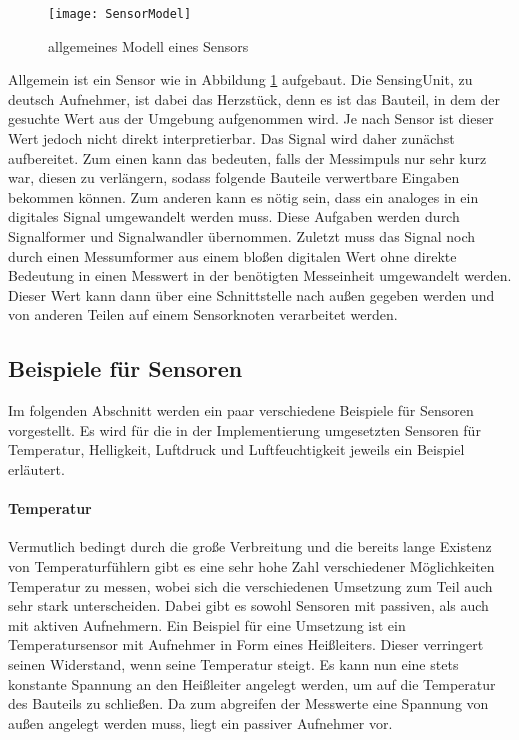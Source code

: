 \begin{figure}[htbp]
\centering
\caption{allgemeines Modell eines Sensors}
\label{fig:SensorModel}
\texttt{[image: SensorModel]}
\end{figure}

Allgemein ist ein Sensor wie in Abbildung \ref{fig:SensorModel} aufgebaut. Die SensingUnit, zu deutsch Aufnehmer, ist dabei das Herzstück, denn es ist das Bauteil, in dem der gesuchte Wert aus der Umgebung aufgenommen wird. Je nach Sensor ist dieser Wert jedoch nicht direkt interpretierbar. Das Signal wird daher zunächst aufbereitet. Zum einen kann das bedeuten, falls der Messimpuls nur sehr kurz war, diesen zu verlängern, sodass folgende Bauteile verwertbare Eingaben bekommen können. Zum anderen kann es nötig sein, dass ein analoges in ein digitales Signal umgewandelt werden muss. Diese Aufgaben werden durch Signalformer und Signalwandler übernommen.\newline
Zuletzt muss das Signal noch durch einen Messumformer aus einem bloßen digitalen Wert ohne direkte Bedeutung in einen Messwert in der benötigten Messeinheit umgewandelt werden. Dieser Wert kann dann über eine Schnittstelle nach außen gegeben werden und von anderen Teilen auf einem Sensorknoten verarbeitet werden.

\subsection{Beispiele für Sensoren}

Im folgenden Abschnitt werden ein paar verschiedene Beispiele für Sensoren vorgestellt. Es wird für die in der Implementierung umgesetzten Sensoren für Temperatur, Helligkeit, Luftdruck und Luftfeuchtigkeit jeweils ein Beispiel erläutert.

\paragraph{Temperatur}

Vermutlich bedingt durch die große Verbreitung und die bereits lange Existenz von Temperaturfühlern gibt es eine sehr hohe Zahl verschiedener Möglichkeiten Temperatur zu messen, wobei sich die verschiedenen Umsetzung zum Teil auch sehr stark unterscheiden. Dabei gibt es sowohl Sensoren mit passiven, als auch mit aktiven Aufnehmern.\newline
Ein Beispiel für eine Umsetzung ist ein Temperatursensor mit Aufnehmer in Form eines Heißleiters. Dieser verringert seinen Widerstand, wenn seine Temperatur steigt. Es kann nun eine stets konstante Spannung an den Heißleiter angelegt werden, um auf die Temperatur des Bauteils zu schließen. Da zum abgreifen der Messwerte eine Spannung von außen angelegt werden muss, liegt ein passiver Aufnehmer vor.

